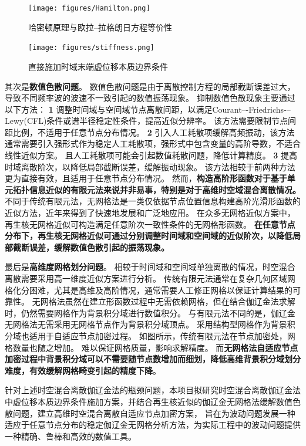 \begin{figure}[!h]
    \centering 
    \texttt{[image: figures/Hamilton.png]}
    \caption{哈密顿原理与欧拉--拉格朗日方程等价性}
    \label{fg:hamilton}
\end{figure}

\begin{figure}[!h]
    \centering 
    \texttt{[image: figures/stiffness.png]}
    \caption{直接施加时域末端虚位移本质边界条件}
    \label{fg:direct}
\end{figure}

其次是\textbf{数值色散问题}。
数值色散问题是由于离散控制方程的局部截断误差过大，导致不同频率波的波速不一致引起的数值振荡现象\cite{zhang2024}。
抑制数值色散现象主要通过以下方法：
\textcircled{\textbf{\small 1}}
调整时间域与空间域节点离散间距，以满足Courant–-Friedrichs-–Lewy(CFL)条件或谱半径稳定性条件，提高近似分辨率。
该方法需要限制节点间距比例，不适用于任意节点分布情况。
\textcircled{\textbf{\small 2}}
引入人工耗散项缓解高频振动，该方法通常需要引入强形式作为稳定人工耗散项，强形式中包含变量的高阶导数，不适合线性近似方案。
且人工耗散项可能会引起数值耗散问题，降低计算精度。
\textcircled{\textbf{\small 3}}
提高时域离散阶次，以降低局部截断误差，缓解振动现象。
该方法相较于前两种方法更为直接有效，且适用于任意节点分布情况。
然而，\textbf{构造高阶形函数对于基于单元拓扑信息近似的有限元法来说并非易事，特别是对于高维时空域混合离散情况。}
不同于传统有限元法，无网格法\cite{Zhang2004a}是一类仅依据节点位置信息构建高阶光滑形函数的近似方法，近年来得到了快速地发展和广泛地应用。
在众多无网格近似方案中，再生核无网格近似可构造满足任意阶次一致性条件的无网格形函数。
\textbf{在任意节点分布下，再生核无网格近似可通过分别调整时间域和空间域的近似阶次，以降低局部截断误差，缓解数值色散引起的振荡现象。}

最后是\textbf{高维度网格划分问题}。
相较于时间域和空间域单独离散的情况，时空混合离散需要采用高一维度近似方案进行分析。
传统有限元法通常在复杂几何区域网格化分困难，尤其是高维及高阶情况，通常需要人工修正网格以保证计算结果的可靠性。
无网格法虽然在建立形函数过程中无需依赖网格，但在结合伽辽金法求解时，仍然需要网格作为背景积分域进行数值积分。
与有限元法不同的是，伽辽金无网格法无需采用无网格节点作为背景积分域顶点。
采用结构型网格作为背景积分域也适用于自适应节点加密过程。
如图所示，传统有限元法在节点加密处，网格数量也随之增加。
难以保证网格质量，影响求解精度。
而\textbf{无网格法自适应节点加密过程中背景积分域可以不需要随节点数增加而细划，降低高维背景积分域划分难度，有效缓解网格畸变引起的精度下降}。

针对上述时空混合离散伽辽金法的瓶颈问题，本项目拟研究时空混合离散伽辽金法中虚位移本质边界条件施加方案，并结合再生核近似的伽辽金无网格法缓解数值色散问题，建立高维时空混合离散自适应节点加密方案，
旨在为波动问题发展一种适应于任意节点分布的稳定伽辽金无网格分析方法，为实际工程中的波动问题提供一种精确、鲁棒和高效的数值工具。

